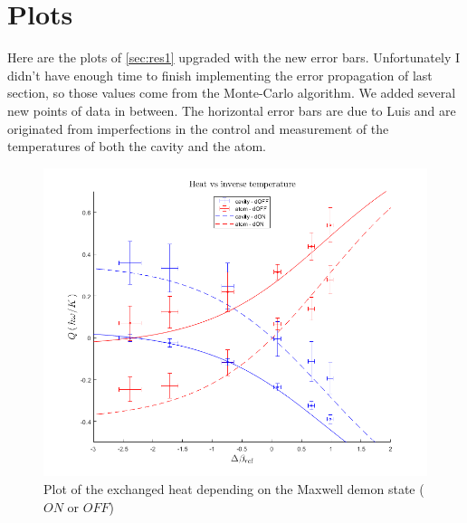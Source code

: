 \documentclass[10pt,a4paper]{report}
\theoremstyle{plain}
\theoremstyle{definition}
\theoremstyle{remark}
\begin{document}
\section{Plots}

Here are the plots of \cref{sec:res1} upgraded with the new error bars.
Unfortunately I didn't have enough time to finish implementing the error
propagation of last section, so those values come from the Monte-Carlo algorithm.
We added several new points of data in between. The horizontal error bars are
due to Luis and are originated from imperfections in the control and measurement of the
temperatures of both the cavity and the atom.



\begin{figure}
  \centering
  \includegraphics[height=0.45\textheight]{plots/Heat2.png}
  \caption{Plot of the exchanged heat depending on the Maxwell demon state ($ON$
    or $OFF$)}\label{fig:heat2}
\end{figure}
\end{document}
